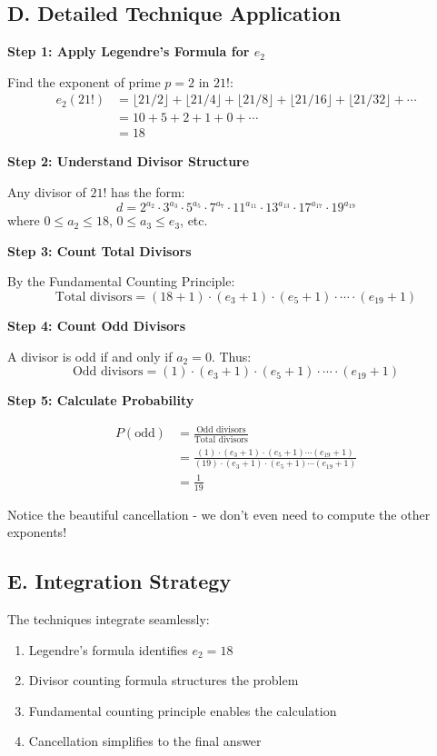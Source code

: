 \documentclass[]{article}
\begin{document}
\begin{techniquesbox}
\subsection*{D. Detailed Technique Application}

\textbf{Step 1: Apply Legendre's Formula for $e_2$}

Find the exponent of prime $p=2$ in $21!$:
\begin{align*}
e_2(21!) &= \lfloor 21/2 \rfloor + \lfloor 21/4 \rfloor + \lfloor 21/8 \rfloor + \lfloor 21/16 \rfloor + \lfloor 21/32 \rfloor + \cdots\\
&= 10 + 5 + 2 + 1 + 0 + \cdots\\
&= 18
\end{align*}

\textbf{Step 2: Understand Divisor Structure}

Any divisor of $21!$ has the form:
\[d = 2^{a_2} \cdot 3^{a_3} \cdot 5^{a_5} \cdot 7^{a_7} \cdot 11^{a_{11}} \cdot 13^{a_{13}} \cdot 17^{a_{17}} \cdot 19^{a_{19}}\]
where $0 \leq a_2 \leq 18$, $0 \leq a_3 \leq e_3$, etc.

\textbf{Step 3: Count Total Divisors}

By the Fundamental Counting Principle:
\[\text{Total divisors} = (18+1) \cdot (e_3+1) \cdot (e_5+1) \cdot \cdots \cdot (e_{19}+1)\]

\textbf{Step 4: Count Odd Divisors}

A divisor is odd if and only if $a_2 = 0$. Thus:
\[\text{Odd divisors} = (1) \cdot (e_3+1) \cdot (e_5+1) \cdot \cdots \cdot (e_{19}+1)\]

\textbf{Step 5: Calculate Probability}

\begin{align*}
P(\text{odd}) &= \frac{\text{Odd divisors}}{\text{Total divisors}}\\
&= \frac{(1) \cdot (e_3+1) \cdot (e_5+1) \cdots (e_{19}+1)}{(19) \cdot (e_3+1) \cdot (e_5+1) \cdots (e_{19}+1)}\\
&= \frac{1}{19}
\end{align*}

Notice the beautiful cancellation - we don't even need to compute the other exponents!

\subsection*{E. Integration Strategy}
The techniques integrate seamlessly:
\begin{enumerate}
    \item Legendre's formula identifies $e_2 = 18$
    \item Divisor counting formula structures the problem
    \item Fundamental counting principle enables the calculation
    \item Cancellation simplifies to the final answer
\end{enumerate}
\end{techniquesbox}
\end{document}
